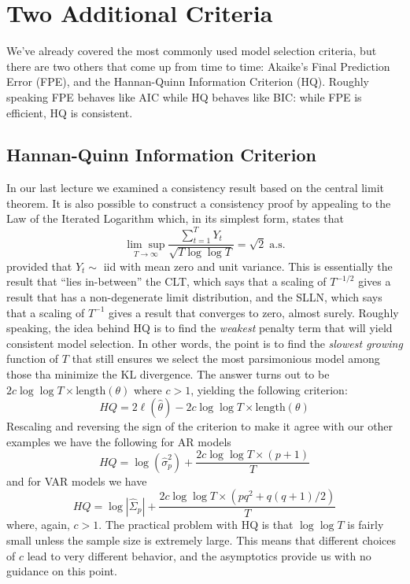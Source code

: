 \section{Two Additional Criteria}
We've already covered the most commonly used model selection criteria, but there are two others that come up from time to time: Akaike's Final Prediction Error (FPE), and the Hannan-Quinn Information Criterion (HQ). Roughly speaking FPE behaves like AIC while HQ behaves like BIC: while FPE is efficient, HQ is consistent.

\subsection{Hannan-Quinn Information Criterion}
In our last lecture we examined a consistency result based on the central limit theorem. It is also possible to construct a consistency proof by appealing to the Law of the Iterated Logarithm which, in its simplest form, states that
	$$\underset{T \rightarrow \infty}{\lim \sup}\frac{\sum_{t=1}^T Y_t}{\sqrt{T \log \log T}} = \sqrt{2} \; \mbox{a.s.}$$
provided that $Y_t \sim$ iid with mean zero and unit variance. This is essentially the result that ``lies in-between'' the CLT, which says that a scaling of $T^{-1/2}$ gives a result that has a non-degenerate limit distribution, and the SLLN, which says that a scaling of $T^{-1}$ gives a result that converges to zero, almost surely. Roughly speaking, the idea behind HQ is to find the \emph{weakest} penalty term that will yield consistent model selection. In other words, the point is to find the \emph{slowest growing} function of $T$ that still ensures we select the most parsimonious model among those tha minimize the KL divergence. The answer turns out to be $2c \log \log T \times \mbox{length}(\theta) $ where $c > 1$, yielding the following criterion:
	$$HQ = 2 \ell(\widehat{\theta}) - 2c \log \log T \times \mbox{length}(\theta) $$
Rescaling and reversing the sign of the criterion to make it agree with our other examples we have the following for AR models
	$$HQ = \log\left(\widehat{\sigma}^2_p \right) + \frac{2c \log \log T \times (p+1)}{T}$$
and for VAR models we have
	$$HQ = \log \left| \widehat{\Sigma}_p\right| +  \frac{2c \log\log T \times (pq^2 + q(q+1)/2)}{T}$$
where, again, $c > 1$. The practical problem with HQ is that $\log \log T$ is fairly small unless the sample size is extremely large. This means that different choices of $c$ lead to very different behavior, and the asymptotics provide us with no guidance on this point. 


